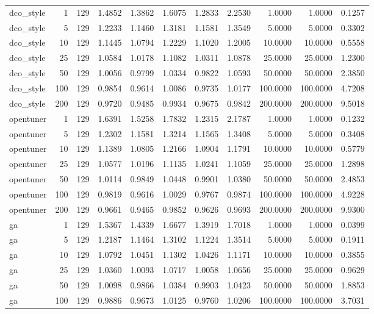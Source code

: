 \begin{table}[t]
\begin{tabular}{lrrrrrrrrrr}
dco\_style & 1 & 129 & 1.4852 & 1.3862 & 1.6075 & 1.2833 & 2.2530 & 1.0000 & 1.0000 & 0.1257 \\
dco\_style & 5 & 129 & 1.2233 & 1.1460 & 1.3181 & 1.1581 & 1.3549 & 5.0000 & 5.0000 & 0.3302 \\
dco\_style & 10 & 129 & 1.1445 & 1.0794 & 1.2229 & 1.1020 & 1.2005 & 10.0000 & 10.0000 & 0.5558 \\
dco\_style & 25 & 129 & 1.0584 & 1.0178 & 1.1082 & 1.0311 & 1.0878 & 25.0000 & 25.0000 & 1.2300 \\
dco\_style & 50 & 129 & 1.0056 & 0.9799 & 1.0334 & 0.9822 & 1.0593 & 50.0000 & 50.0000 & 2.3850 \\
dco\_style & 100 & 129 & 0.9854 & 0.9614 & 1.0086 & 0.9735 & 1.0177 & 100.0000 & 100.0000 & 4.7208 \\
dco\_style & 200 & 129 & 0.9720 & 0.9485 & 0.9934 & 0.9675 & 0.9842 & 200.0000 & 200.0000 & 9.5018 \\
opentuner & 1 & 129 & 1.6391 & 1.5258 & 1.7832 & 1.2315 & 2.1787 & 1.0000 & 1.0000 & 0.1232 \\
opentuner & 5 & 129 & 1.2302 & 1.1581 & 1.3214 & 1.1565 & 1.3408 & 5.0000 & 5.0000 & 0.3408 \\
opentuner & 10 & 129 & 1.1389 & 1.0805 & 1.2166 & 1.0904 & 1.1791 & 10.0000 & 10.0000 & 0.5779 \\
opentuner & 25 & 129 & 1.0577 & 1.0196 & 1.1135 & 1.0241 & 1.1059 & 25.0000 & 25.0000 & 1.2898 \\
opentuner & 50 & 129 & 1.0114 & 0.9849 & 1.0448 & 0.9901 & 1.0380 & 50.0000 & 50.0000 & 2.4853 \\
opentuner & 100 & 129 & 0.9819 & 0.9616 & 1.0029 & 0.9767 & 0.9874 & 100.0000 & 100.0000 & 4.9228 \\
opentuner & 200 & 129 & 0.9661 & 0.9465 & 0.9852 & 0.9626 & 0.9693 & 200.0000 & 200.0000 & 9.9300 \\
ga & 1 & 129 & 1.5367 & 1.4339 & 1.6677 & 1.3919 & 1.7018 & 1.0000 & 1.0000 & 0.0399 \\
ga & 5 & 129 & 1.2187 & 1.1464 & 1.3102 & 1.1224 & 1.3514 & 5.0000 & 5.0000 & 0.1911 \\
ga & 10 & 129 & 1.0792 & 1.0451 & 1.1302 & 1.0426 & 1.1171 & 10.0000 & 10.0000 & 0.3855 \\
ga & 25 & 129 & 1.0360 & 1.0093 & 1.0717 & 1.0058 & 1.0656 & 25.0000 & 25.0000 & 0.9629 \\
ga & 50 & 129 & 1.0098 & 0.9866 & 1.0384 & 0.9903 & 1.0423 & 50.0000 & 50.0000 & 1.8853 \\
ga & 100 & 129 & 0.9886 & 0.9673 & 1.0125 & 0.9760 & 1.0206 & 100.0000 & 100.0000 & 3.7031 \\

\end{tabular}
\end{table}

